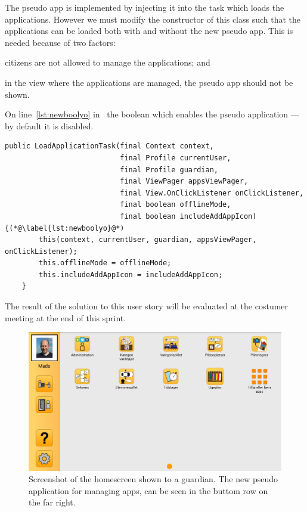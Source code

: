 The pseudo app is implemented by injecting it into the task which loads the applications.
However we must modify the constructor of this class such that the applications can be loaded both with and without the new pseudo app.
This is needed because of two factors: 
\begin{enumberate*}
    \item citizens are not allowed to manage the applications; and
    \item in the view where the applications are managed, the pseudo app should not be shown.
\end{enumberate*}
On line~\ref{lst:newboolyo} in~ the boolean which enables the pseudo application --- by default it is disabled.

\begin{lstlisting}[float, floatplacement=h!, label={lst:modified_constructor}, caption={The new constructor which instantiates the task that loads the applications in the GIRAF launcher}] 
public LoadApplicationTask(final Context context,
                           final Profile currentUser,
                           final Profile guardian,
                           final ViewPager appsViewPager,
                           final View.OnClickListener onClickListener,
                           final boolean offlineMode,
                           final boolean includeAddAppIcon) {(*@\label{lst:newboolyo}@*) 
        this(context, currentUser, guardian, appsViewPager, onClickListener);
        this.offlineMode = offlineMode;
        this.includeAddAppIcon = includeAddAppIcon;
    }
\end{lstlisting}

\bigskip
The result of the solution to this user story will be evaluated at the costumer meeting at the end of this sprint.

\begin{figure}[h!]
    \includegraphics[width=\textwidth]{figures/img/screenshots/addapps_icon.png}
    \caption{Screenshot of the homescreen shown to a guardian. The new pseudo application for managing apps, can be seen in the buttom row on the far right.}\label{fig:addapps}
\end{figure}
